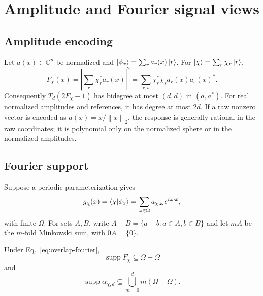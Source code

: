 \documentclass[pdflatex,sn-mathphys,NameDate,iicol]{sn-jnl}
\newcommand{\C}{\mathbb{C}}
\newcommand{\norm}[1]{\left\lVert #1\right\rVert}
\newcommand{\supp}{\operatorname{supp}}
\begin{document}
\section{Amplitude and Fourier signal views}
\label{sec:signals}

\subsection{Amplitude encoding}

Let $a(x)\in\C^n$ be normalized and
$\ket{\phi_x}=\sum_r a_r(x)\ket r$. For
$\ket\chi=\sum_r\chi_r\ket r$,
\begin{equation}
  F_\chi(x)
  =
  \left|\sum_r\chi_r^*a_r(x)\right|^2
  =
  \sum_{r,s}\chi_r^*\chi_s a_r(x)a_s(x)^*.
  \label{eq:amplitude-fidelity}
\end{equation}
Consequently $T_d(2F_\chi-1)$ has bidegree at most $(d,d)$ in
$(a,a^*)$. For real normalized amplitudes and references, it has degree at
most $2d$. If a raw nonzero vector is encoded as
$a(x)=x/\norm{x}_2$, the response is generally rational in the raw
coordinates; it is polynomial only on the normalized sphere or in the
normalized amplitudes.

\subsection{Fourier support}

Suppose a periodic parameterization gives
\begin{equation}
  g_\chi(x)=\braket{\chi | \phi_x}
  =
  \sum_{\omega\in\Omega}
  a_{\chi,\omega}e^{i\omega\cdot x},
  \label{eq:overlap-fourier}
\end{equation}
with finite $\Omega$. For sets $A,B$, write
$A-B=\{a-b:a\in A,b\in B\}$ and let $mA$ be the $m$-fold Minkowski sum,
with $0A=\{0\}$.

\begin{proposition}
\label{prop:fourier-support}
Under Eq.~\eqref{eq:overlap-fourier},
\begin{equation}
  \supp F_\chi\subseteq\Omega-\Omega
\end{equation}
and
\begin{equation}
  \supp\alpha_{\chi,d}
  \subseteq
  \bigcup_{m=0}^{d}m(\Omega-\Omega).
  \label{eq:cheb-fourier-support}
\end{equation}
\end{proposition}
\end{document}
